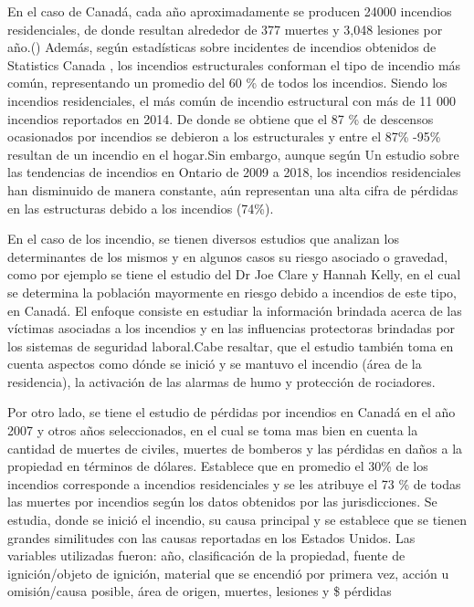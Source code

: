 \documentclass[
  oneside]{memoir}
\begin{document}
En el caso de Canadá, cada año aproximadamente se producen 24000
incendios residenciales, de donde resultan alrededor de 377 muertes y
3,048 lesiones por año.() Además, según estadísticas sobre incidentes de
incendios obtenidos de Statistics Canada , los incendios estructurales
conforman el tipo de incendio más común, representando un promedio del
60 \% de todos los incendios. Siendo los incendios residenciales, el más
común de incendio estructural con más de 11 000 incendios reportados en
2014. De donde se obtiene que el 87 \% de descensos ocasionados por
incendios se debieron a los estructurales y entre el 87\% -95\% resultan
de un incendio en el hogar.Sin embargo, aunque según Un estudio sobre
las tendencias de incendios en Ontario de 2009 a 2018, los incendios
residenciales han disminuido de manera constante, aún representan una
alta cifra de pérdidas en las estructuras debido a los incendios (74\%).

En el caso de los incendio, se tienen diversos estudios que analizan los
determinantes de los mismos y en algunos casos su riesgo asociado o
gravedad, como por ejemplo se tiene el estudio del Dr Joe Clare y Hannah
Kelly, en el cual se determina la población mayormente en riesgo debido
a incendios de este tipo, en Canadá. El enfoque consiste en estudiar la
información brindada acerca de las víctimas asociadas a los incendios y
en las influencias protectoras brindadas por los sistemas de seguridad
laboral.Cabe resaltar, que el estudio también toma en cuenta aspectos
como dónde se inició y se mantuvo el incendio (área de la residencia),
la activación de las alarmas de humo y protección de rociadores.

Por otro lado, se tiene el estudio de pérdidas por incendios en Canadá
en el año 2007 y otros años seleccionados, en el cual se toma mas bien
en cuenta la cantidad de muertes de civiles, muertes de bomberos y las
pérdidas en daños a la propiedad en términos de dólares. Establece que
en promedio el 30\% de los incendios corresponde a incendios
residenciales y se les atribuye el 73 \% de todas las muertes por
incendios según los datos obtenidos por las jurisdicciones. Se estudia,
donde se inició el incendio, su causa principal y se establece que se
tienen grandes similitudes con las causas reportadas en los Estados
Unidos. Las variables utilizadas fueron: año, clasificación de la
propiedad, fuente de ignición/objeto de ignición, material que se
encendió por primera vez, acción u omisión/causa posible, área de
origen, muertes, lesiones y \$ pérdidas
\end{document}
